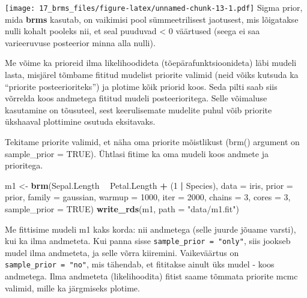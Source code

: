 \documentclass[]{book}
\newenvironment{Shaded}{\begin{snugshade}}{\end{snugshade}}
\newcommand{\KeywordTok}[1]{\textcolor[rgb]{0.13,0.29,0.53}{\textbf{#1}}}
\newcommand{\DataTypeTok}[1]{\textcolor[rgb]{0.13,0.29,0.53}{#1}}
\newcommand{\DecValTok}[1]{\textcolor[rgb]{0.00,0.00,0.81}{#1}}
\newcommand{\StringTok}[1]{\textcolor[rgb]{0.31,0.60,0.02}{#1}}
\newcommand{\OtherTok}[1]{\textcolor[rgb]{0.56,0.35,0.01}{#1}}
\newcommand{\OperatorTok}[1]{\textcolor[rgb]{0.81,0.36,0.00}{\textbf{#1}}}
\newcommand{\NormalTok}[1]{#1}
\begin{document}
\texttt{[image: 17\_brms\_files/figure-latex/unnamed-chunk-13-1.pdf]}
Sigma prior, mida \textbf{brms} kasutab, on vaikimisi pool
sümmeetrilisest jaotusest, mis lõigatakse nulli kohalt pooleks nii, et
seal puuduvad \textless{} 0 väärtused (seega ei saa varieeruvuse
posteerior minna alla nulli).

Me võime ka prioreid ilma likelihoodideta (tõepärafunktsioonideta) läbi
mudeli lasta, misjärel tõmbame fititud mudelist priorite valimid (neid
võiks kutsuda ka ``priorite posteerioriteks'') ja plotime kõik priorid
koos. Seda pilti saab siis võrrelda koos andmetega fititud mudeli
posteerioritega. Selle võimaluse kasutamine on tõusuteel, sest
keerulisemate mudelite puhul võib priorite ükshaaval plottimine osutuda
eksitavaks.

Tekitame priorite valimid, et näha oma priorite mõistlikust (brm()
argument on sample\_prior = TRUE). Ühtlasi fitime ka oma mudeli koos
andmete ja prioritega.

\begin{Shaded}
\begin{Highlighting}[]
\NormalTok{m1 <-}\StringTok{ }\KeywordTok{brm}\NormalTok{(Sepal.Length }\OperatorTok{~}\StringTok{ }\NormalTok{Petal.Length }\OperatorTok{+}\StringTok{ }\NormalTok{(}\DecValTok{1} \OperatorTok{|}\StringTok{ }\NormalTok{Species), }
          \DataTypeTok{data =}\NormalTok{ iris, }
          \DataTypeTok{prior =}\NormalTok{ prior, }
          \DataTypeTok{family =}\NormalTok{ gaussian,}
          \DataTypeTok{warmup =} \DecValTok{1000}\NormalTok{,}
          \DataTypeTok{iter =} \DecValTok{2000}\NormalTok{,}
          \DataTypeTok{chains =} \DecValTok{3}\NormalTok{,}
          \DataTypeTok{cores =} \DecValTok{3}\NormalTok{,}
          \DataTypeTok{sample_prior =} \OtherTok{TRUE}\NormalTok{)}
\KeywordTok{write_rds}\NormalTok{(m1, }\DataTypeTok{path =} \StringTok{"data/m1.fit"}\NormalTok{)}
\end{Highlighting}
\end{Shaded}

Me fittisime mudeli m1 kaks korda: nii andmetega (selle juurde jõuame
varsti), kui ka ilma andmeteta. Kui panna sisse
\texttt{sample\_prior\ =\ "only"}, siis jookseb mudel ilma andmeteta, ja
selle võrra kiiremini. Vaikeväärtus on \texttt{sample\_prior\ =\ "no"},
mis tähendab, et fititakse ainult üks mudel - koos andmetega. Ilma
andmeteta (likelihoodita) fitist saame tõmmata priorite mcmc valimid,
mille ka järgmiseks plotime.

\begin{Shaded}
\end{Shaded}
\end{document}

